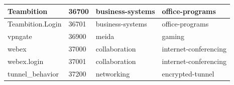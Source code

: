 \begin{longtable}{p{}|p{}|p{}|p{}}
    Teambition &	36700 &	business-systems &	office-programs \\ \hline
    Teambition.Login &	36701 &	business-systems &	office-programs \\ \hline
    vpngate &	36900 &	meida &	gaming \\ \hline
    webex &	37000 &	collaboration &	internet-conferencing \\ \hline
    webex.login &	37001 &	collaboration &	internet-conferencing \\ \hline
    tunnel\_behavior	 &  37200 &	networking &	encrypted-tunnel \\ \hline
\end{longtable}    